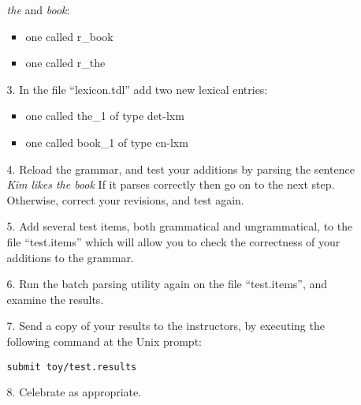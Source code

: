 \documentclass[10pt]{article}
\begin{document}
\begin{itemize}
\begin{itemize}
\emph{the} and \emph{book}:
\begin{itemize}
\item one called \textsf{r\_book} 
\item one called \textsf{r\_the}
\end{itemize}
\item[3.] In the file ``lexicon.tdl'' add two new lexical entries:
\begin{itemize}
\item one called \textsf{the\_1} of type \textsf{det-lxm}
\item one called \textsf{book\_1} of type \textsf{cn-lxm} 
\end{itemize}
\item[4.] Reload the grammar, and test your additions by parsing the sentence
\emph{Kim likes the book}  If it parses correctly then go on to the
next step.  Otherwise, correct your revisions, and test again. 
\item[5.] Add several test items, both grammatical and ungrammatical,
to the file ``test.items'' which will allow you to check the
correctness of your additions to the grammar.   
\item[6.] Run the batch parsing utility again on the file ``test.items'', and
examine the results.
\item[7.] Send a copy of your results to the instructors, by executing the
following command at the Unix prompt:
\par\texttt{submit toy/test.results}
\item[8.] Celebrate as appropriate.
 \end{itemize}\end{itemize}
\end{document}
